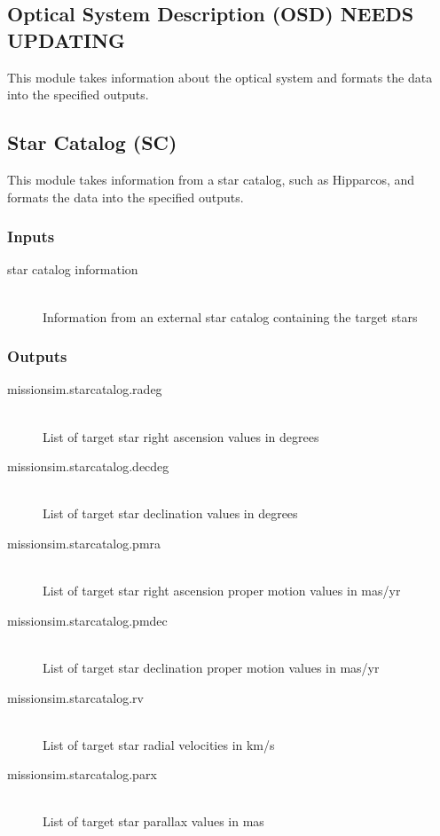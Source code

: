 \documentclass[]{asme2ej}
\begin{document}

\subsection{Optical System Description (OSD) NEEDS UPDATING}
This module takes information about the optical system and formats the data into the specified outputs.


\subsection{Star Catalog (SC)}
This module takes information from a star catalog, such as Hipparcos, and formats the data into the specified outputs.

\subsubsection{Inputs}
\begin{description}
    \item[star catalog information] \hfill \\
    Information from an external star catalog containing the target stars
\end{description}

\subsubsection{Outputs} \label{starcatalog}
\begin{description}
    \item[missionsim.starcatalog.radeg] \hfill \\
    List of target star right ascension values in degrees
    \item[missionsim.starcatalog.decdeg] \hfill \\
    List of target star declination values in degrees
    \item[missionsim.starcatalog.pmra] \hfill \\
    List of target star right ascension proper motion values in mas/yr
    \item[missionsim.starcatalog.pmdec] \hfill \\
    List of target star declination proper motion values in mas/yr
    \item[missionsim.starcatalog.rv] \hfill \\
    List of target star radial velocities in km/s
    \item[missionsim.starcatalog.parx] \hfill \\
    List of target star parallax values in mas
\end{description}
\end{document}
